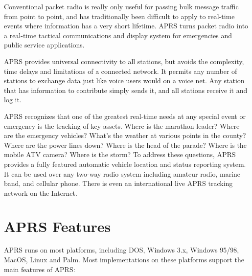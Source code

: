 Conventional packet radio is really only useful for passing bulk message
traffic from point to point, and has traditionally been difficult to apply to
real-time events where information has a very short lifetime. APRS turns
packet radio into a real-time tactical communications and display system for
emergencies and public service applications.

APRS provides universal connectivity to all stations, but avoids the
complexity, time delays and limitations of a connected network. It permits
any number of stations to exchange data just like voice users would on a
voice net. Any station that has information to contribute simply sends it, and
all stations receive it and log it.

APRS recognizes that one of the greatest real-time needs at any special event
or emergency is the tracking of key assets. Where is the marathon leader?
Where are the emergency vehicles? What’s the weather at various points in
the county? Where are the power lines down? Where is the head of the
parade? Where is the mobile ATV camera? Where is the storm?
To address these questions, APRS provides a fully featured automatic
vehicle location and status reporting system. It can be used over any two-way
radio system including amateur radio, marine band, and cellular phone. There
is even an international live APRS tracking network on the Internet.


\section{APRS Features}

APRS runs on most platforms, including DOS, Windows 3.x, Windows
95/98, MacOS, Linux and Palm. Most implementations on these platforms
support the main features of APRS:

